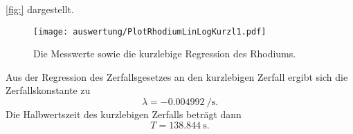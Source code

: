   \ref{fig:} dargestellt.
  \begin{figure}[H]
    \centering
    \texttt{[image: auswertung/PlotRhodiumLinLogKurzl1.pdf]}
    \caption{Die Messwerte sowie die kurzlebige Regression des Rhodiums.}
    \label{fig:PlotRhodiumLinLogKurzl1}
  \end{figure}
  \noindent
  Aus der Regression des Zerfallsgesetzes an den kurzlebigen Zerfall ergibt sich die Zerfallskonstante zu
  \begin{equation}
    \label{eqn:zerfallskonstanterhodiumergebnisskurzlebig}
    \lambda = \SI{-0.004992}{\per\second}.%
  \end{equation}
  Die Halbwertszeit des kurzlebigen Zerfalls beträgt dann
  \begin{equation}
    \label{eqn:halbwertszeitrhodiumergebnisskurzlebig}
    T = \SI{138.844}{\second}.
  \end{equation}
